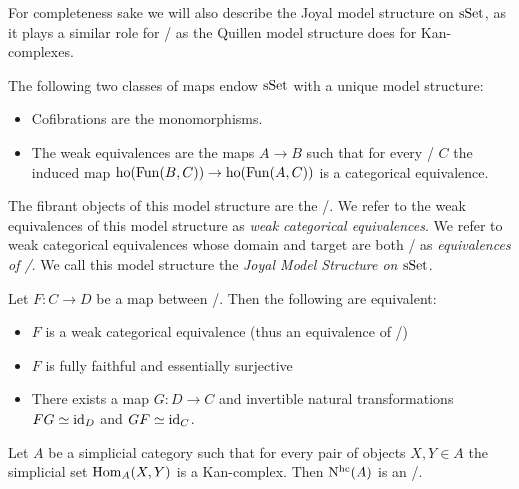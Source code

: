 For completeness sake we will also describe the Joyal model structure on $\operatorname{sSet}$, as it plays a similar role for \inftycats/ as the Quillen model structure does for Kan-complexes.
\begin{prop}
    The following two classes of maps endow $\operatorname{sSet}$ with a unique model structure:
    \begin{itemize}
        \item Cofibrations are the monomorphisms.
        \item The weak equivalences are the maps $A\to B$ such that for every \inftycat/ $C$ the induced map $\operatorname{ho}(\operatorname{Fun}(B,C))\to\operatorname{ho}(\operatorname{Fun}(A,C))$ is a categorical equivalence.
    \end{itemize}
    The fibrant objects of this model structure are the \inftycats/.
    We refer to the weak equivalences of this model structure as \emph{weak categorical equivalences}.
    We refer to weak categorical equivalences whose domain and target are both \inftycats/ as \emph{equivalences of \inftycats/}.
    We call this model structure the \emph{Joyal Model Structure on $\operatorname{sSet}$}.
    \begin{reference}
        \cite[Definition 3.3.7 and Theorem 3.6.8]{cisinski_2019}
    \end{reference}
\end{prop}
\begin{prop}
    Let $F\colon C\to D$ be a map between \inftycats/.
    Then the following are equivalent:
    \begin{itemize}
        \item $F$ is a weak categorical equivalence (thus an equivalence of \inftycats/)
        \item $F$ is fully faithful and essentially surjective
        \item There exists a map $G\colon D\to C$ and invertible natural transformations $FG\simeq \text{id}_D$ and $GF\simeq \text{id}_C$.
    \end{itemize}
    \begin{reference}
        \cite[Corollary 3.6.6 and Theorem 3.9.7]{cisinski_2019}
    \end{reference}
\end{prop}
\begin{prop}
    Let $A$ be a simplicial category such that for every pair of objects $X,Y\in A$ the simplicial set $\operatorname{Hom}_A(X,Y)$ is a Kan-complex.
    Then $\operatorname{N^{hc}}(A)$ is an \inftycat/.
    \begin{reference}
        \cite[Theorem 2.4.5.1]{kerodon}
    \end{reference}
\end{prop}
